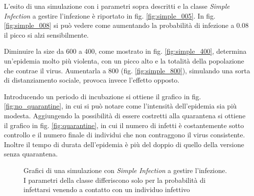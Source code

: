 \documentclass[a4paper,10pt,twocolumn]{article}
\begin{document}
L'esito di una simulazione con i parametri sopra descritti e la classe \emph{Simple Infection} a gestire l'infezione è riportato in fig. \ref{fig:simple_005}. In fig. \ref{fig:simple_008} si può vedere come aumentando la probabilità di infezione a 0.08 il picco si alzi sensibilmente.

Diminuire la size da 600 a 400, come mostrato in fig. \ref{fig:simple_400}, determina un'epidemia molto più violenta, con un picco alto e la totalità della popolazione che contrae il virus. Aumentarla a 800 (fig. \ref{fig:simple_800}), simulando una sorta di distanziamento sociale, provoca invece l'effetto opposto.

Introducendo un periodo di incubazione si ottiene il grafico in fig. \ref{fig:no_quarantine}, in cui si può notare come l'intensità dell'epidemia sia più modesta. Aggiungendo la possibilità di essere costretti alla quarantena si ottiene il grafico in fig. \ref{fig:quarantine}, in cui il numero di infetti è costantemente sotto controllo e il numero finale di individui che non contraggono il virus consistente. Inoltre il tempo di durata dell'epidemia è più del doppio di quello della versione senza quarantena.

\begin{figure}[p]
    \centering
    \caption{Grafici di una simulazione con \emph{Simple Infection} a gestire l'infezione. I parametri della classe differiscono solo per la probabilità di infettarsi venendo a contatto con un individuo infettivo}
    \label{fig:simple}
\end{figure}
\end{document}

